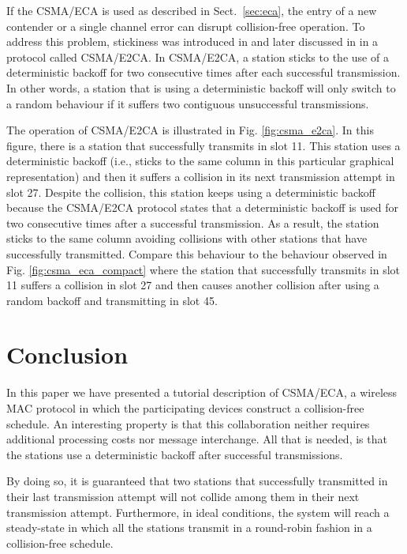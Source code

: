 \documentclass[journal]{IEEEtran}
\begin{document}
If the CSMA/ECA is used as described in Sect.~\ref{sec:eca}, the entry of a new contender or a single channel error can disrupt collision-free operation.
To address this problem, stickiness was introduced in \cite{fang2011dlm} and later discussed in \cite{barcelo2011tcf} in a protocol called CSMA/E2CA.
In CSMA/E2CA, a station sticks to the use of a deterministic backoff for two consecutive times after each successful transmission.
In other words, a station that is using a deterministic backoff will only switch to a random behaviour if it suffers two contiguous unsuccessful transmissions.

The operation of CSMA/E2CA is illustrated in Fig. \ref{fig:csma_e2ca}.
In this figure, there is a station that successfully transmits in slot 11.
This station uses a deterministic backoff (i.e., sticks to the same column in this particular graphical representation) and then it suffers a collision in its next transmission attempt in slot 27.
Despite the collision, this station keeps using a deterministic backoff because the CSMA/E2CA protocol states that a deterministic backoff is used for two consecutive times after a successful transmission.
As a result, the station sticks to the same column avoiding collisions with other stations that have successfully transmitted.
Compare this behaviour to the behaviour observed in Fig. \ref{fig:csma_eca_compact} where the station that successfully transmits in slot 11 suffers a collision in slot 27 and then causes another collision after using a random backoff and transmitting in slot 45.


\section{Conclusion} \label{sec:conclusion}
In this paper we have presented a tutorial description of CSMA/ECA, a wireless MAC protocol in which the participating devices construct a collision-free schedule.
An interesting property is that this collaboration neither requires additional processing costs nor message interchange.
All that is needed, is that the stations use a deterministic backoff after successful transmissions.

By doing so, it is guaranteed that two stations that successfully transmitted in their last transmission attempt will not collide among them in their next transmission attempt.
Furthermore, in ideal conditions, the system will reach a steady-state in which all the stations transmit in a round-robin fashion in a collision-free schedule.
\end{document}
